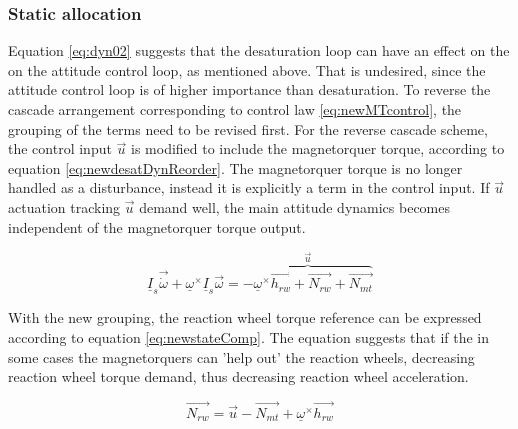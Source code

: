 
\subsubsection{Static allocation}

Equation \ref{eq:dyn02} suggests that the desaturation loop can have an effect on the on the attitude control loop, as mentioned above. That is undesired, since the attitude control loop is of higher importance than desaturation. To reverse the cascade arrangement corresponding to control law \ref{eq:newMTcontrol}, the grouping of the terms need to be revised first. For the reverse cascade scheme, the control input $\vec{u}$ is modified to include the magnetorquer torque, according to equation \ref{eq:newdesatDynReorder}. The magnetorquer torque is no longer handled as a disturbance, instead it is explicitly a term in the control input. If  $\vec{u}$ actuation tracking  $\vec{u}$ demand well, the main attitude dynamics becomes independent of the magnetorquer torque output.

\begin{equation}
\underline I_{s} \vec{\dot{\omega}} + \underline{\omega}^\times\underline I_{s} \vec{\omega} =    \overbrace{-\underline{\omega}^\times\vec{h_{rw}} + \vec{N_{rw}} +  \vec{N_{mt}}}^{\vec{u}}
\label{eq:newdesatDynReorder}
\end{equation}


With the new grouping, the reaction wheel torque reference can be expressed according to equation \ref{eq:newstateComp}. The equation suggests that if the in some cases the magnetorquers can 'help out' the reaction wheels, decreasing reaction wheel torque demand, thus decreasing reaction wheel acceleration. 

\begin{equation}
\vec{N_{rw}} =  \vec{u} - \vec{N_{mt}} +  \underline{\omega}^\times\vec{h_{rw}} 
\label{eq:newstateComp}
\end{equation}




